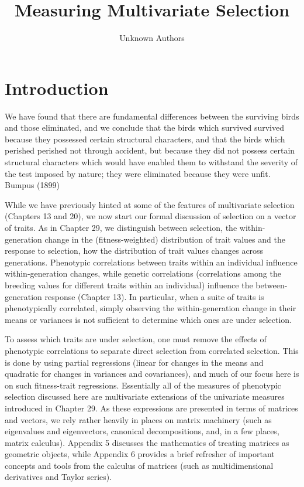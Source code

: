 \documentclass{article}
\title{Measuring Multivariate Selection}
\author{Unknown Authors}
\date{}
\begin{document}
\maketitle

\begin{abstract}

\end{abstract}

\section{Introduction}
We have found that there are fundamental differences between the surviving birds and those eliminated, and we conclude that the birds which survived survived because they possessed certain structural characters, and that the birds which perished perished not through accident, but because they did not possess certain structural characters which would have enabled them to withstand the severity of the test imposed by nature; they were eliminated because they were unfit. Bumpus (1899)

While we have previously hinted at some of the features of multivariate selection (Chapters 13 and 20), we now start our formal discussion of selection on a vector of traits. As in Chapter 29, we distinguish between selection, the within-generation change in the (fitness-weighted) distribution of trait values and the response to selection, how the distribution of trait values changes across generations. Phenotypic correlations between traits within an individual influence within-generation changes, while genetic correlations (correlations among the breeding values for different traits within an individual) influence the between-generation response (Chapter 13). In particular, when a suite of traits is phenotypically correlated, simply observing the within-generation change in their means or variances is not sufficient to determine which ones are under selection.

To assess which traits are under selection, one must remove the effects of phenotypic correlations to separate direct selection from correlated selection. This is done by using partial regressions (linear for changes in the means and quadratic for changes in variances and covariances), and much of our focus here is on such fitness-trait regressions. Essentially all of the measures of phenotypic selection discussed here are multivariate extensions of the univariate measures introduced in Chapter 29. As these expressions are presented in terms of matrices and vectors, we rely rather heavily in places on matrix machinery (such as eigenvalues and eigenvectors, canonical decompositions, and, in a few places, matrix calculus). Appendix 5 discusses the mathematics of treating matrices as geometric objects, while Appendix 6 provides a brief refresher of important concepts and tools from the calculus of matrices (such as multidimensional derivatives and Taylor series).
\end{document}
